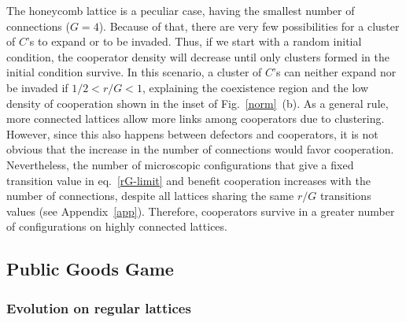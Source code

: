 \documentclass[5p,review]{elsarticle}
\begin{document}
The honeycomb lattice is a peculiar case, having the smallest number of connections ($G=4$). Because of that, there are very few possibilities for a cluster of $C$'s to expand or to be invaded. Thus, if we start with a random initial condition, the cooperator density will decrease until only clusters formed in the initial condition survive. In this scenario, a cluster of $C$'s can neither expand nor be invaded if $1/2<r/G<1$, explaining the coexistence region and the low density of cooperation shown in the inset of Fig.~\ref{norm}~(b).
%
As a general rule, more connected lattices allow more links among cooperators due to clustering. However, since this also happens between defectors and cooperators, it is not obvious that the increase in the number of connections would favor cooperation.
%
Nevertheless, the number of microscopic configurations that give a fixed transition value in eq.~\ref{rG-limit} and benefit cooperation increases with the number of connections, despite all lattices sharing the same $r/G$ transitions values (see Appendix~\ref{app}). 
% 
Therefore, cooperators survive in a greater number of configurations on highly connected lattices.

\subsection{Public Goods Game}
\label{sec_pgg}

\subsubsection*{Evolution on regular lattices}
\end{document}
